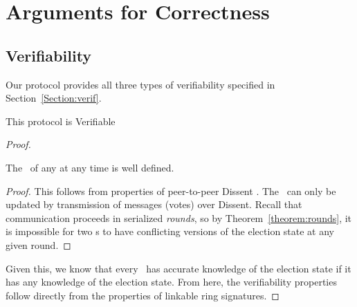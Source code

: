 \section{Arguments for Correctness}
\subsection{Verifiability}
Our protocol provides all three types of verifiability specified in
Section~\ref{Section:verif}.

\begin{theorem} This protocol is Verifiable\end{theorem}

\begin{proof}

  \begin{lemma}The \StructElectionState~of any \StructElection at
  any time is well defined. \end{lemma}
  \begin{proof}This follows from properties of peer-to-peer Dissent \cite{sec}.
    The \StructElectionState~can only be updated by transmission of messages
    (votes) over Dissent. Recall that communication proceeds in serialized
    \emph{rounds}, so by Theorem~\ref{theorem:rounds}, it is impossible for two
    \KwPeer s to have conflicting versions of the election state at any
    given round.
  \end{proof}

  Given this, we know that every \KwPeer~has accurate knowledge of the
  election state if it has any knowledge of the election state. From here, the
  verifiability properties follow directly from the properties of linkable ring
  signatures.


\end{proof}
